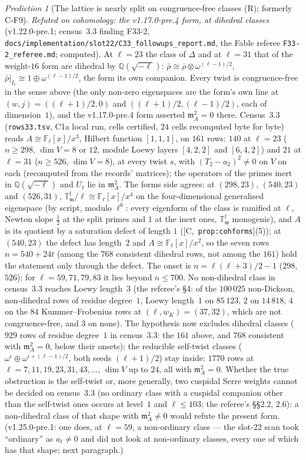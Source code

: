 \documentclass[11pt]{article}
\theoremstyle{remark}
\newtheorem{prediction}[theorem]{Prediction}
\newcommand{\F}{\mathbb{F}}
\newcommand{\Q}{\mathbb{Q}}
\newcommand{\Fl}{\F_\ell}
\newcommand{\T}{\mathbb{T}}
\newcommand{\m}{\mathfrak{m}}
\newcommand{\HA}[1]{[C,~\texttt{#1}]}      %
\begin{document}
\begin{prediction}[The lattice is nearly split on congruence-free classes (R); formerly C-F9]
\emph{Refuted on cohomology: the v1.17.0-pre.4 form, at dihedral classes} (v1.22.0-pre.1; census~3.3 finding F33-2,
\texttt{docs/implementation/slot22/C33\_followups\_report.md}, the Fable referee \texttt{F33-2\_referee.md}; computed).
At $\ell=23$ the class of $\Delta$ and at $\ell=31$ that of the weight-$16$ form are dihedral by $\Q(\sqrt{-\ell})$:
$\bar\rho\cong\bar\rho\otimes\omega^{(\ell-1)/2}$, $\bar\rho|_{I_\ell}\cong1\oplus\omega^{(\ell-1)/2}$, the form its own
companion. Every twist is congruence-free in the sense above (the only non-zero eigenspaces are the form's own line at
$(w,j)=((\ell+1)/2,0)$ and $((\ell+1)/2,(\ell-1)/2)$, each of dimension~$1$), and the v1.17.0-pre.4 form asserted
$\m_A^2=0$ there. Census~3.3 (\texttt{rows33.tsv}, C1a local run, cells certified, $24$ cells recomputed byte for byte)
reads $A\cong\Fl[x]/x^{3}$, Hilbert function $[1,1,1]$, on $161$ rows: $140$ at $\ell=23$ ($n\ge298$, $\dim V=8$ or $12$,
module Loewy layers $[4,2,2]$ and $[6,4,2]$) and $21$ at $\ell=31$ ($n\ge526$, $\dim V=8$), at every twist $s$, with
$(T_2-a_2)^{2}\ne0$ on $V$ on each (recomputed from the records' matrices); the operators of the primes inert in
$\Q(\sqrt{-\ell})$ and $U_\ell$ lie in $\m_A^{2}$. The forms side agrees: at $(298,23)$, $(540,23)$ and $(526,31)$,
$\T^{\mathrm f}_\m/\ell\cong\Fl[x]/x^{4}$ on the four-dimensional generalised eigenspace (by script, modulo $\ell^{6}$:
every eigenform of the class is ramified at $\ell$, Newton slope $\tfrac12$ at the split primes and $1$ at the inert
ones, $\T^{\mathrm f}_\m$ monogenic), and $A$ is its quotient by a saturation defect of length $1$ (\HA{prop:cohforms}(5));
at $(540,23)$ the defect has length~$2$ and $A\cong\Fl[x]/x^{2}$, so the seven rows $n=540+24t$ (among the $768$ consistent dihedral rows, not among the $161$) hold the statement only
through the defect. The onset is $n=\ell(\ell+3)/2-1$ ($298$, $526$); for $\ell=59,71,79,83$ it lies beyond $n\le700$.
No non-dihedral class in census~3.3 reaches Loewy length~$3$ (the referee's \S4: of the $100\,025$ non-Dickson, non-dihedral
rows of residue degree~$1$, Loewy length~$1$ on $85\,123$, $2$ on $14\,818$, $4$ on the $84$ Kummer--Frobenius rows at
$(\ell,w_K)=(37,32)$, which are not congruence-free, and $3$ on none). The hypothesis now
excludes dihedral classes ($929$ rows of residue degree~$1$ in census~3.3: the $161$ above, and $768$ consistent with $\m_A^2=0$,
below their onsets); the reducible self-twist classes ($\omega^{i}\oplus\omega^{i+(\ell-1)/2}$, both seeds
$(\ell+1)/2$) stay inside: $1770$ rows at $\ell=7,11,19,23,31,43,\dots$, $\dim V$ up to $24$, all with $\m_A^{2}=0$.
Whether the true obstruction is the self-twist or, more generally, two cuspidal Serre weights cannot be decided on census~3.3
(no ordinary class with a cuspidal companion other than the self-twist ones occurs at level~$1$ and $\ell\le103$; the referee's
\S\S2.2, 2.6): a non-dihedral class of that shape with $\m_A^2\ne0$ would refute the present form. (v1.25.0-pre.1: one does, at $\ell=59$, a
non-ordinary class --- the slot-22 scan took ``ordinary'' as $a_\ell\ne0$ and did not look at non-ordinary classes, every one of which has that shape;
next paragraph.)


\end{prediction}
\end{document}
